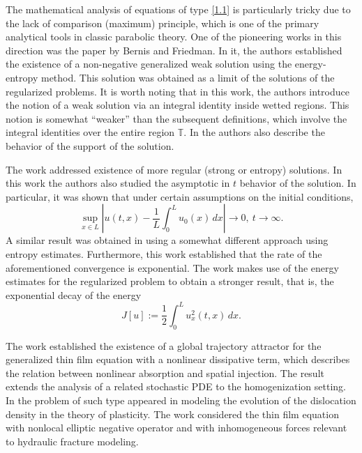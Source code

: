 \documentclass[a4paper,12pt]{article}
\numberwithin{equation}{section}
\begin{document}
The mathematical analysis of equations of type \eqref{1.1} is particularly tricky due to the lack of comparison (maximum) principle, which is one of the primary analytical tools in classic parabolic theory. One of the pioneering works in this direction was the paper  \cite{Bern} by Bernis and Friedman. In it, the authors established the existence of a non-negative generalized weak solution using the energy-entropy method. This solution was obtained as a limit of the solutions of the regularized problems. It is worth noting that in this work, the authors introduce the notion of a weak solution via an integral identity inside wetted regions. This notion is somewhat ``weaker'' than the subsequent definitions, which involve the integral identities over the entire region $\mathbb{T}$.  In \cite{Bern} the authors also describe the behavior of the support of the solution. 

 The work \cite{DalPas} addressed existence of more regular (strong or entropy) solutions.  In this work the authors also studied the asymptotic in $t$ behavior of the solution. In particular, it was shown that under certain assumptions on the initial conditions,
 \begin{equation}\label{1.3}
 \sup_{x \in L}\left|u(t,x) - \frac{1}{L} \int_0^L u_0(x) \, dx \right| \to 0, \ t \to \infty.
 \end{equation}
 A similar result was obtained in \cite{BertPugh} using a somewhat different approach using entropy estimates. Furthermore, this work established that the rate of the aforementioned convergence is exponential.  The work \cite{Tud} makes use of the energy estimates for the regularized problem to obtain a stronger result, that is, the exponential decay of the energy
 \begin{equation}\label{energy}
 J[u]:= \frac{1}{2} \int_0^L u_x^2(t,x) \, dx.
 \end{equation}
 
The work \cite{KapTar} established the existence of a global trajectory attractor for the generalized thin film equation with a nonlinear dissipative term, which describes the relation between nonlinear absorption and spatial injection. The result \cite{Wang} extends the analysis of a related  stochastic PDE to the homogenization setting.  In  \cite{Grun95} the problem of such type appeared in modeling the evolution of the dislocation density in the theory of plasticity. The work \cite{Jin} considered the thin film equation with nonlocal elliptic negative operator and with inhomogeneous forces relevant to hydraulic fracture modeling.
\end{document}
